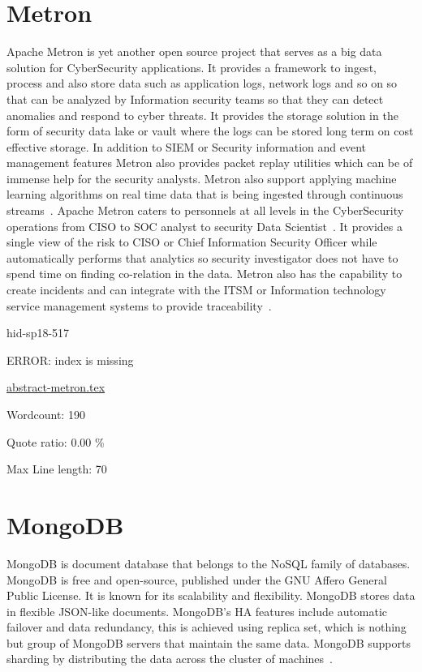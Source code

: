 \section{Metron}

Apache Metron is yet another open source project that serves as a big
data solution for CyberSecurity applications. It provides a framework
to ingest, process and also store data such as application logs,
network logs and so on so that can be analyzed by Information security
teams so that they can detect anomalies and respond to cyber
threats. It provides the storage solution in the form of security data
lake or vault where the logs can be stored long term on cost effective
storage. In addition to SIEM or Security information and event
management features Metron also provides packet replay utilities which
can be of immense help for the security analysts.  Metron also support
applying machine learning algorithms on real time data that is being
ingested through continuous streams~\cite{hid-sp18-517-metron-apache}.
Apache Metron caters to personnels at all levels in the CyberSecurity
operations from CISO to SOC analyst to security Data
Scientist~\cite{hid-sp18-517-metron-hortonworks}.  It provides a
single view of the risk to CISO or Chief Information Security Officer
while automatically performs that analytics so security investigator
does not have to spend time on finding co-relation in the data. Metron
also has the capability to create incidents and can integrate with the
ITSM or Information technology service management systems to provide
traceability~\cite{hid-sp18-517-metron-hortonworks}.


\begin{IU}

hid-sp18-517

ERROR: index is missing

\href{https://github.com/cloudmesh-community/hid-sp18-517/blob/master//technology/abstract-metron.tex}{abstract-metron.tex}

 

Wordcount: 190


Quote ratio: 0.00 \%
 
Max Line length: 70
\end{IU}

\section{MongoDB}

MongoDB is document database that belongs to the NoSQL family of 
databases. MongoDB is free and open-source, published under the 
GNU Affero General Public License. It is known for its scalability 
and flexibility. MongoDB stores data in flexible JSON-like 
documents. MongoDB's HA features include automatic failover and 
data redundancy, this is achieved using replica set, which is 
nothing but group of MongoDB servers that maintain the same data. 
MongoDB supports sharding by distributing the data across the 
cluster of machines~\cite{hid-sp18-517-MongoDB-intro}.




